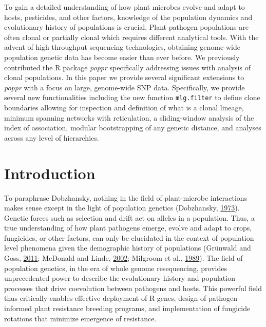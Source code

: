 \documentclass[double,12pt]{beavtex}
\begin{document}
  To gain a detailed understanding of how plant microbes evolve and adapt
  to hosts, pesticides, and other factors, knowledge of the population
  dynamics and evolutionary history of populations is crucial. Plant
  pathogen populations are often clonal or partially clonal which requires
  different analytical tools. With the advent of high throughput
  sequencing technologies, obtaining genome-wide population genetic data
  has become easier than ever before. We previously contributed the R
  package \emph{poppr} specifically addressing issues with analysis of
  clonal populations. In this paper we provide several significant
  extensions to \emph{poppr} with a focus on large, genome-wide SNP data.
  Specifically, we provide several new functionalities including the new
  function \texttt{mlg.filter} to define clone boundaries allowing for
  inspection and definition of what is a clonal lineage, minimum spanning
  networks with reticulation, a sliding-window analysis of the index of
  association, modular bootstrapping of any genetic distance, and analyses
  across any level of hierarchies.
  
  \section{Introduction}\label{introduction-2}
  
  To paraphrase Dobzhansky, nothing in the field of plant-microbe
  interactions makes sense except in the light of population genetics
  (Dobzhansky, \protect\hyperlink{ref-dobzhansky2013nothing}{1973}).
  Genetic forces such as selection and drift act on alleles in a
  population. Thus, a true understanding of how plant pathogens emerge,
  evolve and adapt to crops, fungicides, or other factors, can only be
  elucidated in the context of population level phenomena given the
  demographic history of populations (Grünwald and Goss,
  \protect\hyperlink{ref-grunwald2011evolution}{2011}; McDonald and Linde,
  \protect\hyperlink{ref-Mcdonald2002}{2002}; Milgroom et al.,
  \protect\hyperlink{ref-milgroom1989population}{1989}). The field of
  population genetics, in the era of whole genome resequencing, provides
  unprecedented power to describe the evolutionary history and population
  processes that drive coevolution between pathogens and hosts. This
  powerful field thus critically enables effective deployment of R genes,
  design of pathogen informed plant resistance breeding programs, and
  implementation of fungicide rotations that minimize emergence of
  resistance.
  
\end{document}
